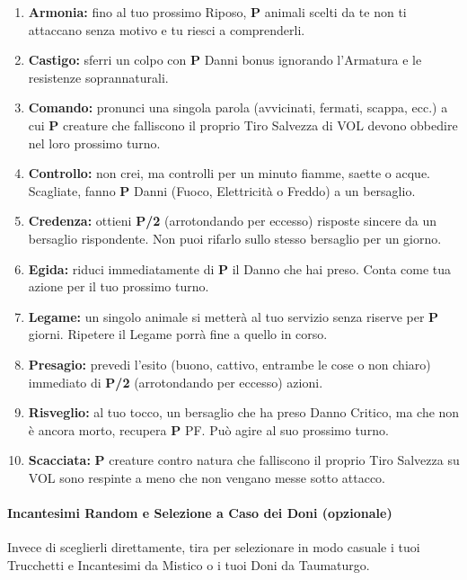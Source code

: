 \documentclass[itdr]{subfiles}
\begin{document}
\begin{enumerate}
	\item \textbf{Armonia:} fino al tuo prossimo Riposo, \textbf{P} animali scelti da te non ti attaccano senza motivo e tu riesci a comprenderli.
	\item \textbf{Castigo:} sferri un colpo con \textbf{P} Danni bonus ignorando l’Armatura e le resistenze soprannaturali.
	\item \textbf{Comando:} pronunci una singola parola (avvicinati, fermati, scappa, ecc.) a cui \textbf{P} creature che falliscono il proprio Tiro Salvezza di VOL devono obbedire nel loro prossimo turno.
	\item \textbf{Controllo:} non crei, ma controlli per un minuto fiamme, saette o acque. Scagliate, fanno \textbf{P} Danni (Fuoco, Elettricità o Freddo) a un bersaglio.
	\item \textbf{Credenza:} ottieni \textbf{P/2} (arrotondando per eccesso) risposte sincere da un bersaglio rispondente. Non puoi rifarlo sullo stesso bersaglio per un giorno.
	\item \textbf{Egida:} riduci immediatamente di \textbf{P} il Danno che hai preso. Conta come tua azione per il tuo prossimo turno.
	\item \textbf{Legame:} un singolo animale si metterà al tuo servizio senza riserve per \textbf{P} giorni. Ripetere il Legame porrà fine a quello in corso.
	\item \textbf{Presagio:} prevedi l’esito (buono, cattivo, entrambe le cose o non chiaro) immediato di \textbf{P/2} (arrotondando per eccesso) azioni.
	\item \textbf{Risveglio:} al tuo tocco, un bersaglio che ha preso Danno \mbox{Critico}, ma che non è ancora morto, recupera \textbf{P} PF. Può agire al suo prossimo turno.	
	\item \textbf{Scacciata:} \textbf{P} creature contro natura che falliscono il proprio Tiro Salvezza su VOL sono respinte a meno che non vengano messe sotto attacco.
\end{enumerate}

\break

\vfill
{}
\begin{dbox}
	\paragraph{Incantesimi Random e Selezione a Caso dei Doni (opzionale)}
	 Invece di \mbox{sceglierli} direttamente, tira per selezionare in modo casuale i tuoi Trucchetti e Incantesimi da Mistico o i tuoi Doni da Taumaturgo.
\end{dbox}
\end{document}
